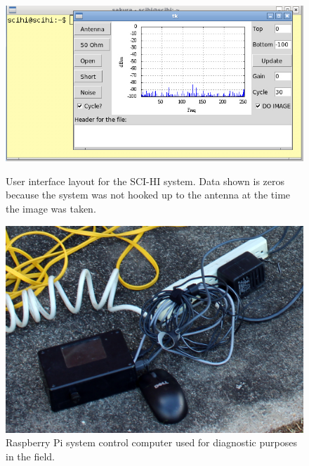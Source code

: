 \begin{figure}[htb]
\centering
\begin{minipage}[b]{0.54\textwidth}
\centering
\includegraphics[width=0.95\linewidth]{SCIHI_system/figures/SCIHI_UI_Screen.jpg}
\caption{User interface layout for the SCI-HI system. Data shown is zeros because the system was not hooked up to the antenna at the time the image was taken.}
\label{Fig:GUI}
\end{minipage}%
\begin{minipage}[b]{0.02\textwidth}
\hspace{1cm}
\end{minipage}%
\begin{minipage}[b]{0.43\textwidth}
\centering
\includegraphics[width=0.95\linewidth]{SCIHI_system/figures/SCIHI_raspberry_pi.jpg}
\caption{Raspberry Pi system control computer used for diagnostic purposes in the field. }
\label{Fig:raspberry_pi}

\end{minipage}
\end{figure}


